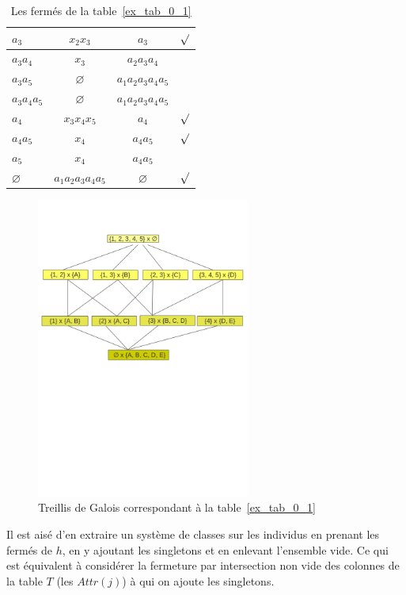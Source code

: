 \documentclass[a4paper]{report}
\renewcommand{\textbf}[1]{\begingroup\bfseries\mathversion{bold}#1\endgroup}
\begin{document}
\begin{table}[htb]
\begin{tabular}{l|c|c|c}
\hline
\textbf{$a_3$} & \textbf{$x_2x_3$} & $a_3$ & $\surd$\\
\hline
$a_3a_4$ & $x_3$ & $a_2a_3a_4$ & \\
\hline
$a_3a_5$ & $\varnothing$ & $a_1a_2a_3a_4a_5$ & \\
\hline
$a_3a_4a_5$ & $\varnothing$ & $a_1a_2a_3a_4a_5$ & \\
\hline
\textbf{$a_4$} & \textbf{$x_3x_4x_5$} & $a_4$ & $\surd$\\
\hline
\textbf{$a_4a_5$} & \textbf{$x_4$} & $a_4a_5$ & $\surd$\\
\hline
$a_5$ & $x_4$ & $a_4a_5$ & \\
\hline
\textbf{$\varnothing$} & \textbf{$a_1a_2a_3a_4a_5$} & $\varnothing$ & $\surd$

\end{tabular}

\caption{Les fermés de la table~\ref{ex_tab_0_1}}
\label{ga}
\end{table}
 

\begin{figure}
\begin{center}
\includegraphics[width=7cm]{images/treillis}
\end{center}
\caption{ Treillis de Galois correspondant à  la table~\ref{ex_tab_0_1}}
\label{Fig:treillis}
\end{figure}

Il est  aisé d'en extraire un système de classes sur les individus en prenant les fermés de $h$, en y ajoutant les singletons et en enlevant l'ensemble vide. Ce qui est équivalent à considérer la fermeture par intersection non vide des colonnes de la table $T$ (les $Attr(j)$)  à qui on ajoute les singletons. 
\end{document}
